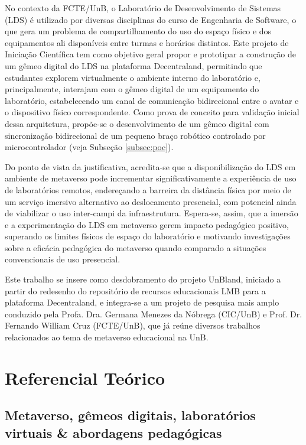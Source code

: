\documentclass[12pt]{article}
\begin{document}
No contexto da FCTE/UnB, o Laboratório de Desenvolvimento de Sistemas (LDS) é utilizado por diversas disciplinas do curso de Engenharia de Software, o que gera um problema de compartilhamento do uso do espaço físico e dos equipamentos ali disponíveis entre turmas e horários distintos. Este projeto de Iniciação Científica tem como objetivo geral propor e prototipar a construção de um gêmeo digital do LDS na plataforma Decentraland, permitindo que estudantes explorem virtualmente o ambiente interno do laboratório e, principalmente, interajam com o gêmeo digital de um equipamento do laboratório, estabelecendo um canal de comunicação bidirecional entre o avatar e o dispositivo físico correspondente. Como prova de conceito para validação inicial dessa arquitetura, propõe-se o desenvolvimento de um gêmeo digital com sincronização bidirecional de um pequeno braço robótico controlado por microcontrolador (veja Subseção \ref{subsec:poc}).

Do ponto de vista da justificativa, acredita-se que a disponibilização do LDS em ambiente de metaverso pode incrementar significativamente a experiência de uso de laboratórios remotos, endereçando a barreira da distância física por meio de um serviço imersivo alternativo ao deslocamento presencial, com potencial ainda de viabilizar o uso inter-campi da infraestrutura. Espera-se, assim, que a imersão e a experimentação do LDS em metaverso gerem impacto pedagógico positivo, superando os limites físicos de espaço do laboratório e motivando investigações sobre a eficácia pedagógica do metaverso quando comparado a situações convencionais de uso presencial.

Este trabalho se insere como desdobramento do projeto UnBland, iniciado a partir do redesenho do repositório de recursos educacionais LMB para a plataforma Decentraland, e integra-se a um projeto de pesquisa mais amplo conduzido pela Profa. Dra. Germana Menezes da Nóbrega (CIC/UnB) e Prof. Dr. Fernando William Cruz (FCTE/UnB), que já reúne diversos trabalhos relacionados ao tema de metaverso educacional na UnB.

\section{Referencial Teórico}

\subsection{Metaverso, gêmeos digitais, laboratórios virtuais \& abordagens pedagógicas}
\label{subsec:referencial}
\end{document}
